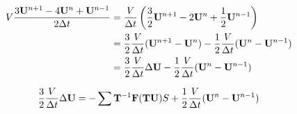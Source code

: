 \documentclass{article}
\begin{document}
\begin{equation}
    \begin{aligned}
        V\frac{3\mathbf{U}^{n+1}-4\mathbf{U}^n+\mathbf{U}^{n-1}}{2\Delta t}
        &=
        \frac{V}{\Delta t}
        \left(
            \frac{3}{2}\mathbf{U}^{n+1}-2\mathbf{U}^n+\frac{1}{2}\mathbf{U}^{n-1}
        \right)
        \\
        &=
        \frac{3}{2}\frac{V}{\Delta t}(\mathbf{U}^{n+1}-\mathbf{U}^n)
        -
        \frac{1}{2}\frac{V}{\Delta t}(\mathbf{U}^{n} - \mathbf{U}^{n-1})
        \\
        &=
        \frac{3}{2}\frac{V}{\Delta t}\Delta\mathbf{U}
        -
        \frac{1}{2}\frac{V}{\Delta t}(\mathbf{U}^{n} - \mathbf{U}^{n-1})
    \end{aligned}
\end{equation}

\begin{equation}
    \frac{3}{2}\frac{V}{\Delta t}\Delta\mathbf{U}
    =
    -\sum\mathbf{T}^{-1}\mathbf{F}(\mathbf{T}\mathbf{U})S + \frac{1}{2}\frac{V}{\Delta t}(\mathbf{U}^{n} - \mathbf{U}^{n-1})
\end{equation}
\end{document}
